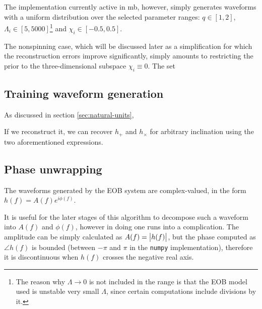 \documentclass[main.tex]{subfiles}
\begin{document}
The implementation currently active in \ac{mb}, however, simply generates waveforms with a uniform distribution over the selected parameter ranges: \(q \in [1, 2]\), \(\Lambda _i \in [5, 5000]\)\footnote{The reason why \(\Lambda \to 0\) is not included in the range is that the \ac{EOB} model used is unstable very small \(\Lambda \), since certain computations include divisions by it.} and \(\chi_i \in [-0.5, 0.5]\).

The nonspinning case, which will be discussed later as a simplification for which the reconstruction errors improve significantly, simply amounts to restricting the prior to the three-dimensional subspace \(\chi _i \equiv 0\). 
The set

\subsection{Training waveform generation}

As discussed in section \ref{sec:natural-units}, 

If we reconstruct it, we can recover \(h_{+}\) and \(h_{\times }\) for arbitrary inclination using the two aforementioned expressions.


\subsection{Phase unwrapping} \label{sec:unwrapping}

The waveforms generated by the \ac{EOB} system are complex-valued, in the form \(h(f) = A(f) e^{i \phi (f)}\).

It is useful for the later stages of this algorithm to decompose such a waveform into \(A(f)\) and \(\phi (f)\), however in doing one runs into a complication.
The amplitude can be simply calculated as \(A(f) = \abs{h(f)}\), but the phase computed as \(\angle h(f)\) is bounded (between \(-\pi \) and \( \pi \) in the \texttt{numpy} implementation), therefore it is discontinuous when \(h(f)\) crosses the negative real axis. 
\end{document}
